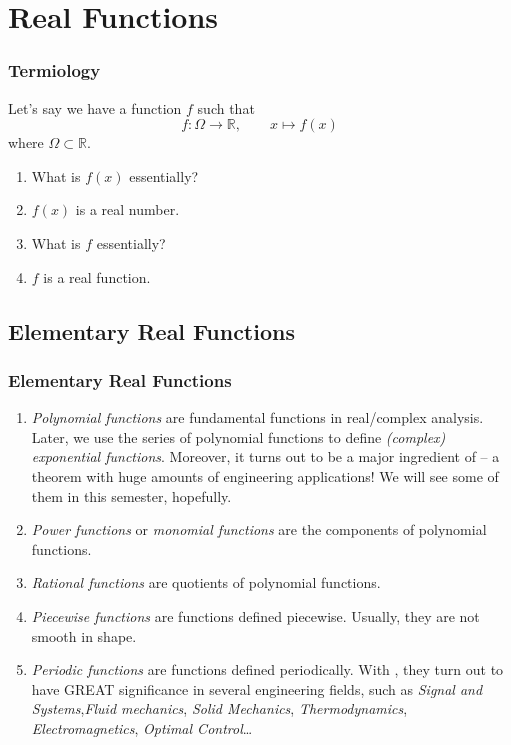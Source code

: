\documentclass[10pt, t]{beamer}
\renewcommand{\emph}[1]{{\color{themecolor}\textsl{#1}}}
\newcommand{\alarm}[1]{{\color{bladerunnerred}{#1}}}
\newcommand{\R}{\mathbb{R}}
\begin{document}
\section{Real Functions}

\begin{frame}
    \frametitle{Termiology}
    Let's say we have a function $f$ such that
    $$f:\Omega\to \R,\qquad x\mapsto f(x)$$
    where $\Omega\subset\R$.
    \begin{enumerate}
        \item What is $f(x)$ essentially?
        \item $f(x)$ is a real number.
        \item What is $f$ essentially?
        \item $f$ is a real function.
    \end{enumerate}
\end{frame}
\subsection{Elementary Real Functions}
\begin{frame}
    \frametitle{Elementary Real Functions}

    \begin{enumerate}
        \item
              \emph{Polynomial functions} are fundamental functions in real/complex analysis. Later, we use the series of polynomial functions to define \emph{(complex) exponential functions}. Moreover, it turns out to be a major ingredient of \alarm{Taylor's Theorem} -- a theorem with huge amounts of engineering applications! We will see some of them in this semester, hopefully.
        \item
              \emph{Power functions} or \emph{monomial functions} are the components of polynomial functions.
        \item \emph{Rational functions} are quotients of polynomial functions.
        \item \emph{Piecewise functions} are functions defined piecewise. Usually, they are not smooth in shape.
        \item \emph{Periodic functions} are functions defined periodically. With \alarm{Fourier analysis}, they turn out to have GREAT significance in several engineering fields, such as \emph{Signal and Systems},\emph{Fluid mechanics}, \emph{Solid Mechanics}, \emph{Thermodynamics}, \emph{Electromagnetics}, \emph{Optimal Control}\dots
    \end{enumerate}
\end{frame}
\end{document}
